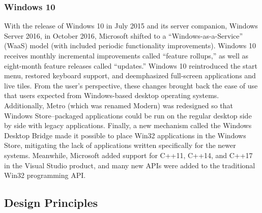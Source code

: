 \documentclass[12pt]{article}
\begin{document}
\subsubsection*{Windows 10}
With the release of Windows 10 in July 2015 and its server companion,
Windows Server 2016, in October 2016, Microsoft shifted to a “Windows-as-a-Service” (WaaS) model (with included periodic functionality improvements).
Windows 10 receives monthly incremental improvements called “feature
rollups,” as well as eight-month feature releases called “updates.” Windows 10 reintroduced the start menu, restored keyboard support, and
deemphasized full-screen applications and live tiles. From the user’s perspective,
these changes brought back the ease of use that users expected from
Windows-based desktop operating systems. Additionally, Metro (which was
renamed Modern) was redesigned so that Windows Store–packaged applications
could be run on the regular desktop side by side with legacy applications.
Finally, a new mechanism called the Windows Desktop Bridge made it possible
to place Win32 applications in the Windows Store, mitigating the lack of
applications written specifically for the newer systems. Meanwhile, Microsoft
added support for C++11, C++14, and C++17 in the Visual Studio product,
and many new APIs were added to the traditional Win32 programming API.
\subsection*{Design Principles}
\end{document}
